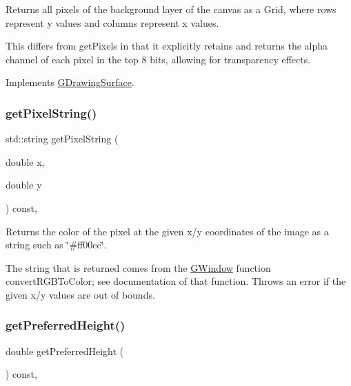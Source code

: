 Returns all pixels of the background layer of the canvas as a Grid, where rows represent y values and columns represent x values. 

This differs from get\+Pixels in that it explicitly retains and returns the alpha channel of each pixel in the top 8 bits, allowing for transparency effects. 

Implements \mbox{\hyperlink{classGDrawingSurface_a5712954f3edce2e1e4dd3109ffe16e05}{G\+Drawing\+Surface}}.

\mbox{\label{classGDrawingSurface_a8da04ef488ec5fa498fbbffaf50928fd}} 
\subsubsection{\texorpdfstring{get\+Pixel\+String()}{getPixelString()}}
{\footnotesize\ttfamily std\+::string get\+Pixel\+String (\begin{DoxyParamCaption}\item[{double}]{x,  }\item[{double}]{y }\end{DoxyParamCaption}) const\hspace{0.3cm}{\ttfamily [virtual]}, {\ttfamily [inherited]}}



Returns the color of the pixel at the given x/y coordinates of the image as a string such as \char`\"{}\#ff00cc\char`\"{}. 

The string that is returned comes from the {\ttfamily \mbox{\hyperlink{classGWindow}{G\+Window}}} function {\ttfamily convert\+R\+G\+B\+To\+Color}; see documentation of that function. Throws an error if the given x/y values are out of bounds. \mbox{\label{classGInteractor_a747de0961653847bdc6615dbf756d715}} 
\subsubsection{\texorpdfstring{get\+Preferred\+Height()}{getPreferredHeight()}}
{\footnotesize\ttfamily double get\+Preferred\+Height (\begin{DoxyParamCaption}{ }\end{DoxyParamCaption}) const\hspace{0.3cm}{\ttfamily [virtual]}, {\ttfamily [inherited]}}



